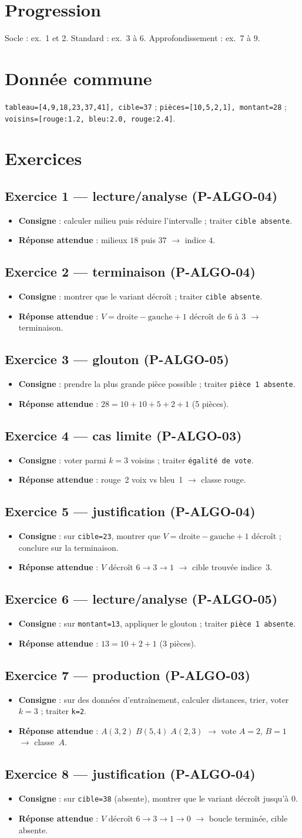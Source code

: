 \documentclass[a4paper,11pt]{article}
\newcommand{\exo}[5]{\subsection*{Exercice #1 — #2 (#3)}\begin{itemize}[nosep]\item \textbf{Consigne} : #4\item \textbf{Réponse attendue} : #5\end{itemize}}
\begin{document}

\section*{Progression}
Socle : ex.~1 et 2. \quad Standard : ex.~3 à 6. \quad Approfondissement : ex.~7 à 9.

\section*{Donnée commune}
\texttt{tableau=[4,9,18,23,37,41], cible=37} ; \texttt{pièces=[10,5,2,1], montant=28} ; \texttt{voisins=[rouge:1.2, bleu:2.0, rouge:2.4]}.

\section*{Exercices}
\exo{1}{lecture/analyse}{P-ALGO-04}{calculer milieu puis réduire l'intervalle ; traiter \texttt{cible absente}.}{milieux $18$ puis $37$ $\rightarrow$ indice $4$.}
\exo{2}{terminaison}{P-ALGO-04}{montrer que le variant décroît ; traiter \texttt{cible absente}.}{$V = \text{droite} - \text{gauche} + 1$ décroît de $6$ à $3$ $\rightarrow$ terminaison.}
\exo{3}{glouton}{P-ALGO-05}{prendre la plus grande pièce possible ; traiter \texttt{pièce 1 absente}.}{$28 = 10+10+5+2+1$ (5 pièces).}
\exo{4}{cas limite}{P-ALGO-03}{voter parmi $k=3$ voisins ; traiter \texttt{égalité de vote}.}{rouge~2 voix vs bleu~1 $\rightarrow$ classe rouge.}
\exo{5}{justification}{P-ALGO-04}{sur \texttt{cible=23}, montrer que $V = \text{droite} - \text{gauche} + 1$ décroît ; conclure sur la terminaison.}{$V$ décroît $6 \rightarrow 3 \rightarrow 1$ $\rightarrow$ cible trouvée indice~$3$.}
\exo{6}{lecture/analyse}{P-ALGO-05}{sur \texttt{montant=13}, appliquer le glouton ; traiter \texttt{pièce 1 absente}.}{$13 = 10+2+1$ (3 pièces).}
\exo{7}{production}{P-ALGO-03}{sur des données d'entraînement, calculer distances, trier, voter $k=3$ ; traiter \texttt{k=2}.}{$A(3{,}2)\;B(5{,}4)\;A(2{,}3)$ $\rightarrow$ vote $A{=}2$, $B{=}1$ $\rightarrow$ classe~$A$.}
\exo{8}{justification}{P-ALGO-04}{sur \texttt{cible=38} (absente), montrer que le variant décroît jusqu'à $0$.}{$V$ décroît $6 \rightarrow 3 \rightarrow 1 \rightarrow 0$ $\rightarrow$ boucle terminée, cible absente.}
\end{document}
